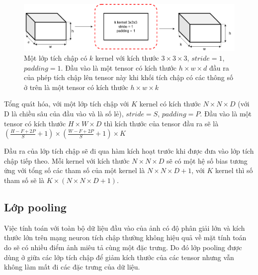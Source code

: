 \begin{figure}[ht!]
	\centerline{\includegraphics[scale=0.4]{images/convol_layer_in_out.png}}
  	\caption{Một lớp tích chập có $k$ kernel với kích thước $3 \times 3 \times 3$, $stride = 1$, $padding = 1$. Đầu vào là một tensor có kích thước $h \times w \times d$ đầu ra của phép tích chập lên tensor này khi khối tích chập có các thông số ở trên là một tensor có kích thước $h \times w \times k$}
  	\label{fig:convol_layer_in_out}
\end{figure}
Tổng quát hóa, với một lớp tích chập với $K$ kernel có kích thước $N \times N \times D$ (với D là chiều sâu của đầu vào và là số lẻ), $stride=S$, $padding=P$. Đầu vào là một tensor có kích thước $H \times W \times D$ thì kích thước của tensor đầu ra sẽ là
$\left( 
	\frac
		{{H-F+2P}}
		{S}
	+1
\right)
\times
\left( 
	\frac
		{{W-F+2P}}
		{S}
	+1
\right)
\times
K$

Đầu ra của lớp tích chập sẽ đi qua hàm kích hoạt trước khi được đưa vào lớp tích chập tiếp theo. Mỗi kernel với kích thước $N \times N \times D$ sẽ có một hệ số bias tương ứng với tổng số các tham số của một kernel là $N \times N \times D+1$, với $K$ kernel thì số tham số sẽ là $K \times (N \times N \times D+1)$.
\subsection{Lớp pooling}
Việc tính toán với toàn bộ dữ liệu đầu vào của ảnh có độ phân giải lớn và kích thước lớn trên mạng neuron tích chập thường không hiệu quả về mặt tính toán do sẽ có nhiều điểm ảnh miêu tả cùng một đặc trưng. Do đó lớp pooling được dùng ở giữa các lớp tích chập để giảm kích thước của các tensor nhưng vẫn không làm mất đi các đặc trưng của dữ liệu.

